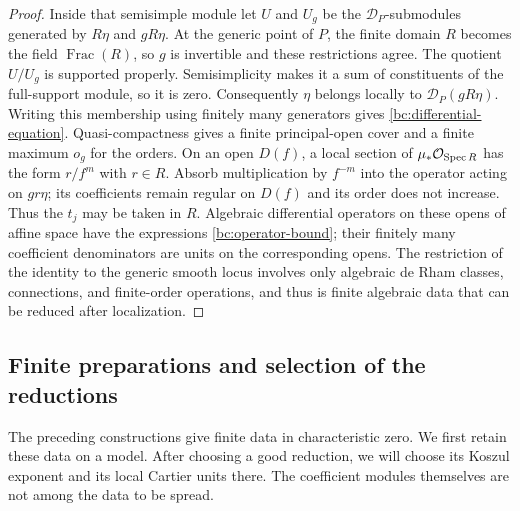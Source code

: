 \begin{proof}
Inside that semisimple module let $U$ and $U_g$ be the
$\mathcal D_P$-submodules generated by $R\eta$ and $gR\eta$.
At the generic point of $P$, the finite domain $R$ becomes the field
$\operatorname{Frac}(R)$, so $g$ is invertible and these restrictions
agree.
The quotient $U/U_g$ is supported properly.  Semisimplicity makes it a
sum of constituents of the full-support module, so it is zero.
Consequently $\eta$ belongs locally to $\mathcal D_P(gR\eta)$.
Writing this membership using finitely many generators gives
\eqref{bc:differential-equation}.  Quasi-compactness gives a finite
principal-open cover and a finite maximum $o_g$ for the orders.
On an open $D(f)$, a local section of $\mu_*\mathcal O_{\operatorname{Spec} R}$ has the form
$r/f^m$ with $r\in R$.  Absorb multiplication by $f^{-m}$ into the
operator acting on $gr\eta$; its coefficients remain regular on $D(f)$
and its order does not increase.  Thus the $t_j$ may be taken in $R$.
Algebraic differential operators on these opens of affine space have
the expressions \eqref{bc:operator-bound}; their finitely many
coefficient denominators are units on the corresponding opens.
The restriction of the identity to the
generic smooth locus involves only algebraic de Rham classes,
connections, and finite-order operations, and thus is finite algebraic
data that can be reduced after localization.
\end{proof}

\subsection{Finite preparations and selection of the reductions}

The preceding constructions give finite data in characteristic zero.
We first retain these data on a model.  After choosing a good reduction,
we will choose its Koszul exponent and its local Cartier units there.
The coefficient modules themselves are not among the data to be spread.

